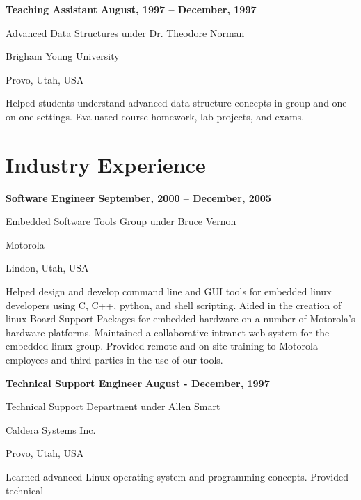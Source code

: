 \documentclass[margin,line,article]{res}
\newenvironment{list1}{
  \begin{list}{}{%
      \setlength{\itemsep}{0in}
      \setlength{\parsep}{0in} \setlength{\parskip}{0in}
      \setlength{\topsep}{0in} \setlength{\partopsep}{0in} 
      \setlength{\leftmargin}{0.17in}}}{\end{list}}
\begin{document}
\begin{resume}
\textbf{Teaching Assistant} \hfill \textbf{August, 1997 -- December, 1997}\\
\vspace{-10pt}
\begin{list1}
\item Advanced Data Structures under Dr. Theodore Norman
\item Brigham Young University
\item Provo, Utah, USA
\vspace{6pt}
\item Helped students understand advanced data structure concepts in group and one on one 
settings. Evaluated course homework, lab projects, and exams. 
\end{list1}



\section{Industry Experience}
\textbf{Software Engineer} \hfill \textbf{September, 2000 -- December, 2005}\\
\vspace{-10pt}
\begin{list1}
\item Embedded Software Tools Group under Bruce Vernon
\item Motorola
\item Lindon, Utah, USA
\vspace{6pt}
\item Helped design and develop command line and GUI tools for embedded linux developers
using C, C++, python, and shell scripting. Aided in the creation of linux Board 
Support Packages for embedded hardware on a number of Motorola's hardware platforms. 
Maintained a collaborative intranet web system for the embedded linux group. 
Provided remote and on-site training to Motorola employees and third parties in the 
use of our tools. 
\end{list1}

\textbf{Technical Support Engineer} \hfill \textbf{August - December, 1997}\\
\vspace{-10pt}
\begin{list1}
\item Technical Support Department under Allen Smart
\item Caldera Systems Inc.
\item Provo, Utah, USA
\vspace{6pt}
\item Learned advanced Linux operating system and programming concepts. Provided technical


\end{list1}
\end{resume}
\end{document}
